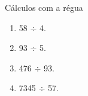 \begin{task}{Cálculos com a régua}
\begin{enumerate}
\item 58 $\div$ 4. %
\item 93 $\div$ 5.%
\item 476 $\div$ 93.%
\item 7345 $\div$ 57.%
\end{enumerate}
\end{task}

